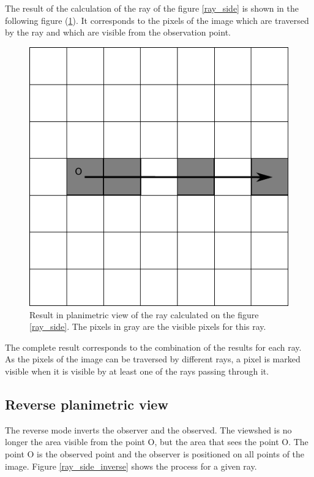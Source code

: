 \documentclass{report}
\begin{document}
The result of the calculation of the ray of the figure \ref{ray_side} is shown in the following figure (\ref {grid_result}). It corresponds to the pixels of the image which are traversed by the ray and which are visible from the observation point.

\begin{figure}[H]
	\includegraphics[scale=0.8]{img/grid_result.pdf} 
	\caption{Result in planimetric view of the ray calculated on the figure \ref{ray_side}. The pixels in gray are the visible pixels for this ray.}
	\label{grid_result}
\end{figure}

The complete result corresponds to the combination of the results for each ray.
As the pixels of the image can be traversed by different rays, a pixel is marked visible when it is visible by at least one of the rays passing through it.

\subsection{Reverse planimetric view}

The reverse mode inverts the observer and the observed. The viewshed is no longer the area visible from the point O, but the area that sees the point O. The point O is the observed point and the observer is positioned on all points of the image. Figure \ref{ray_side_inverse} shows the process for a given ray.
\end{document}
